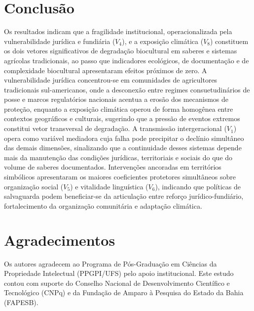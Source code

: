 \documentclass[12pt,a4paper]{article}
\begin{document}
\section{Conclusão}
\label{sec:conclusions}

Os resultados indicam que a fragilidade institucional, operacionalizada pela vulnerabilidade jurídica e fundiária ($V_4$), e a exposição climática ($V_8$) constituem os dois vetores significativos de degradação biocultural em saberes e sistemas agrícolas tradicionais, ao passo que indicadores ecológicos, de documentação e de complexidade biocultural apresentaram efeitos próximos de zero. A vulnerabilidade jurídica concentrou-se em comunidades de agricultores tradicionais sul-americanos, onde a desconexão entre regimes consuetudinários de posse e marcos regulatórios nacionais acentua a erosão dos mecanismos de proteção, enquanto a exposição climática operou de forma homogênea entre contextos geográficos e culturais, sugerindo que a pressão de eventos extremos constitui vetor transversal de degradação. A transmissão intergeracional ($V_1$) opera como variável mediadora cuja falha pode precipitar o declínio simultâneo das demais dimensões, sinalizando que a continuidade desses sistemas depende mais da manutenção das condições jurídicas, territoriais e sociais do que do volume de saberes documentados. Intervenções ancoradas em territórios simbólicos apresentaram os maiores coeficientes protetores simultâneos sobre organização social ($V_5$) e vitalidade linguística ($V_6$), indicando que políticas de salvaguarda podem beneficiar-se da articulação entre reforço jurídico-fundiário, fortalecimento da organização comunitária e adaptação climática.

\section*{Agradecimentos}

Os autores agradecem ao Programa de Pós-Graduação em Ciências da Propriedade Intelectual (PPGPI/UFS) pelo apoio institucional. Este estudo contou com suporte do Conselho Nacional de Desenvolvimento Científico e Tecnológico (CNPq) e da Fundação de Amparo à Pesquisa do Estado da Bahia (FAPESB).
\end{document}
